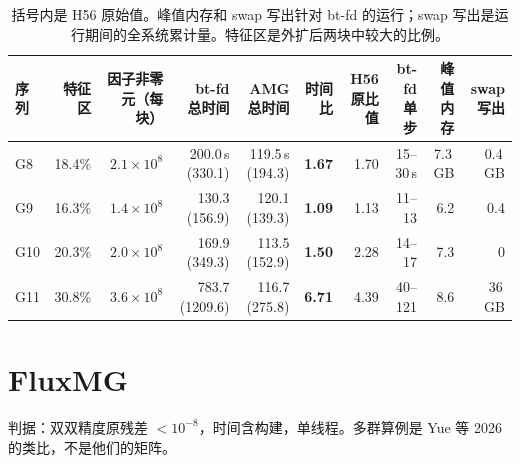 \begin{table}[H]
\centering\scriptsize\setlength{\tabcolsep}{3pt}
\begin{tabular}{lrrrrrrrrr}
\toprule
序列 & 特征区 & 因子非零元（每块） & bt-fd 总时间 & AMG 总时间 & 时间比 & H56 原比值 & bt-fd 单步 & 峰值内存 & swap 写出 \\
\midrule
G8 & 18.4\% & $2.1\times10^{8}$ & 200.0\,s (330.1) & 119.5\,s (194.3) & \textbf{1.67} & 1.70 & 15--30\,s & 7.3\,GB & 0.4\,GB \\
G9 & 16.3\% & $1.4\times10^{8}$ & 130.3 (156.9) & 120.1 (139.3) & \textbf{1.09} & 1.13 & 11--13 & 6.2 & 0.4 \\
G10 & 20.3\% & $2.0\times10^{8}$ & 169.9 (349.3) & 113.5 (152.9) & \textbf{1.50} & 2.28 & 14--17 & 7.3 & 0 \\
G11 & 30.8\% & $3.6\times10^{8}$ & 783.7 (1209.6) & 116.7 (275.8) & \textbf{6.71} & 4.39 & 40--121 & 8.6 & 36\,GB \\
\bottomrule
\end{tabular}
\caption{括号内是 H56 原始值。峰值内存和 swap 写出针对 bt-fd 的运行；swap 写出是运行期间的全系统累计量。特征区是外扩后两块中较大的比例。}
\end{table}
\FloatBarrier
\section{FluxMG}
判据：双双精度原残差 $<10^{-8}$，时间含构建，单线程。多群算例是 Yue 等 2026 的类比，不是他们的矩阵。
